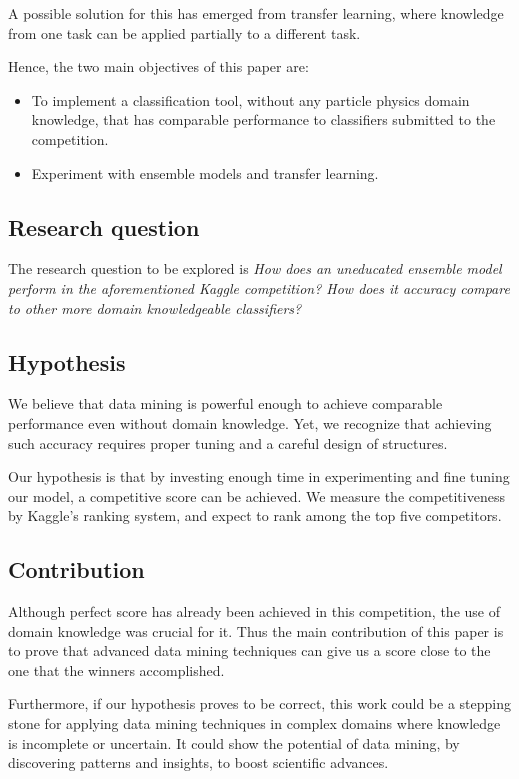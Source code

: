\documentclass[conference]{IEEEtran}
\begin{document}
A possible solution for this has emerged from transfer learning, where knowledge from one task can be applied partially to a different task.

Hence, the two main objectives of this paper are:

\begin{itemize}
	\item To implement a classification tool, without any particle physics domain knowledge, that has comparable performance to classifiers submitted to the competition.
	\item Experiment with ensemble models and transfer learning.
\end{itemize}

\subsection{Research question}
\label{sec:researchQuestions}
The research question to be explored is \textit{How does an uneducated ensemble model perform in the aforementioned Kaggle competition? How does it accuracy compare to other more domain knowledgeable classifiers?}

\subsection{Hypothesis}
\label{sec:hypothesis}
We believe that data mining is powerful enough to achieve comparable performance even without domain knowledge. Yet, we recognize that achieving such accuracy requires proper tuning and a careful design of structures.

Our hypothesis is that by investing enough time in experimenting and fine tuning our model, a competitive score can be achieved. We measure the competitiveness by Kaggle's ranking system, and expect to rank among the top five competitors.

\subsection{Contribution}
Although perfect score has already been achieved in this competition, the use of domain knowledge was crucial for it. Thus the main contribution of this paper is to prove that advanced data mining techniques can give us a score close to the one that the winners accomplished.

Furthermore, if our hypothesis proves to be correct, this work could be a stepping stone for applying data mining techniques in complex domains where knowledge is incomplete or uncertain. It could show the potential of data mining, by discovering patterns and insights, to boost scientific advances.
\end{document}
